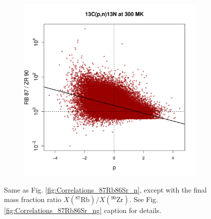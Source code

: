 \begin{figure}[!p]
\begin{subfigure}[b]{0.495\textwidth}
\end{subfigure}
\hfill
\begin{subfigure}[b]{0.495\textwidth}   
\centering 
\includegraphics[width=\textwidth]{Chapter-3/figs/CorrRB87ZR90_13C_p_n_13N_300MK.png}
\end{subfigure}
\caption{\label{fig:Correlations_87Rb90Zr_n}Same as Fig. \ref{fig:Correlations_87Rb86Sr_n}, except with the final mass fraction ratio $X(^{87}\mathrm{Rb})/X(^{90}\mathrm{Zr})$. See Fig. \ref{fig:Correlations_87Rb86Sr_ng} caption for details.}
\end{figure}

